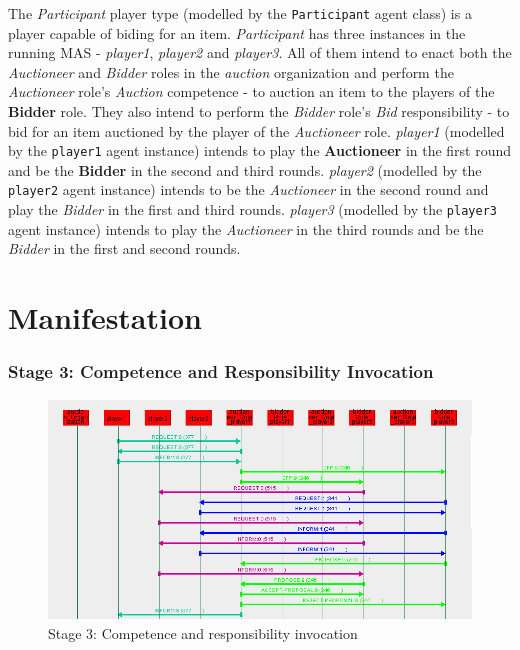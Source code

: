 The \textit{Participant} player type (modelled by the \texttt{Participant} agent class) is a player capable of biding for an item.
\textit{Participant} has three instances in the running MAS - \textit{player1}, \textit{player2} and \textit{player3}.
All of them intend to enact both the \textit{Auctioneer} and \textit{Bidder} roles in the \textit{auction} organization and perform the \textit{Auctioneer} role's \textit{Auction} competence - to auction an item to the players of the \textbf{Bidder} role.
They also intend to perform the \textit{Bidder} role's \textit{Bid} responsibility - to bid for an item auctioned by the player of the \textit{Auctioneer} role.
\textit{player1} (modelled by the \texttt{player1} agent instance) intends to play the \textbf{Auctioneer} in the first round and be the \textbf{Bidder} in the second and third rounds.
\textit{player2} (modelled by the \texttt{player2} agent instance) intends to be the \textit{Auctioneer} in the second round and play the \textit{Bidder} in the first and third rounds.
\textit{player3} (modelled by the \texttt{player3} agent instance) intends to play the \textit{Auctioneer} in the third rounds and be the \textit{Bidder} in the first and second rounds.

\section{Manifestation} 

\subsubsection*{Stage 3: Competence and Responsibility Invocation}

\begin{figure}[H]
	\centering
	\includegraphics[width=\textwidth]{images/example3-stage3.png}
	\caption{Stage 3: Competence and responsibility invocation}
	\label{figure:example3-stage3}
\end{figure}

